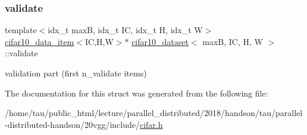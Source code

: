 \subsubsection{\texorpdfstring{validate}{validate}}
{\footnotesize\ttfamily template$<$idx\+\_\+t maxB, idx\+\_\+t IC, idx\+\_\+t H, idx\+\_\+t W$>$ \\
\hyperlink{structcifar10__data__item}{cifar10\+\_\+data\+\_\+item}$<$IC,H,W$>$$\ast$ \hyperlink{structcifar10__dataset}{cifar10\+\_\+dataset}$<$ maxB, IC, H, W $>$\+::validate}

validation part (first n\+\_\+validate items) 

The documentation for this struct was generated from the following file\+:\begin{DoxyCompactItemize}
\item 
/home/tau/public\+\_\+html/lecture/parallel\+\_\+distributed/2018/handson/tau/parallel-\/distributed-\/handson/20vgg/include/\hyperlink{cifar_8h}{cifar.\+h}\end{DoxyCompactItemize}
